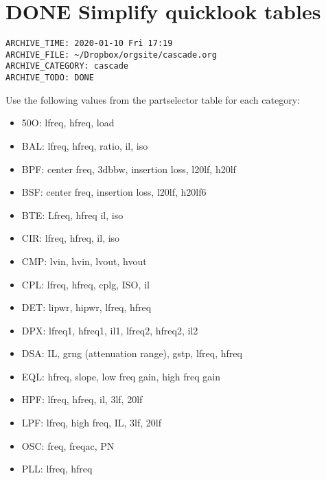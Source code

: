 \documentclass[11pt]{article}
\begin{document}
\section*{{\bfseries\sffamily DONE}  Simplify quicklook tables}
\label{sec:org13fa1a9}
\begin{verbatim}
ARCHIVE_TIME: 2020-01-10 Fri 17:19
ARCHIVE_FILE: ~/Dropbox/orgsite/cascade.org
ARCHIVE_CATEGORY: cascade
ARCHIVE_TODO: DONE
\end{verbatim}
Use the following values from the partselector table for each category:\\
\begin{itemize}
\item 50O: lfreq, hfreq, load\\
\item BAL: lfreq, hfreq, ratio, il, iso\\
\item BPF: center freq, 3dbbw, insertion loss, l20lf, h20lf\\
\item BSF: center freq, insertion loss, l20lf, h20lf6\\
\item BTE: Lfreq, hfreq il, iso\\
\item CIR: lfreq, hfreq, il, iso\\
\item CMP: lvin, hvin, lvout, hvout\\
\item CPL: lfreq, hfreq, cplg, ISO, il\\
\item DET: lipwr, hipwr, lfreq, hfreq\\
\item DPX: lfreq1, hfreq1, il1, lfreq2, hfreq2, il2\\
\item DSA: IL, grng (attenuation range), gstp, lfreq, hfreq\\
\item EQL: hfreq, slope, low freq gain, high freq gain\\
\item HPF: lfreq, hfreq, il, 3lf, 20lf\\
\item LPF: lfreq, high freq, IL, 3lf, 20lf\\
\item OSC: freq, freqac, PN\\
\item PLL: lfreq, hfreq\\

\end{itemize}
\end{document}
